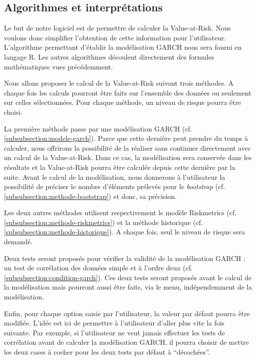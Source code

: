 	\subsection{Algorithmes et interprétations}
		Le but de notre logiciel est de permettre de calculer la Value-at-Risk. Nous voulons donc simplifier l'obtention de cette information pour l'utilisateur. L'algorithme permettant d'établir la modélisation GARCH nous sera fourni en langage R. Les autres algorithmes découlent directement des formules mathématiques vues précédemment.

		Nous allons proposer le calcul de la Value-at-Risk suivant trois méthodes. A chaque fois les calculs pourront être faits sur l'ensemble des données ou seulement sur celles sélectionnées. Pour chaque méthode, un niveau de risque pourra être choisi.

		La première méthode passe par une modélisation GARCH (cf. \ref{subsubsection:modele-garch}). Parce que cette dernière peut prendre du temps à calculer, nous offrirons la possibilité de la réaliser sans continuer directement avec un calcul de la Value-at-Risk. Dans ce cas, la modélisation sera conservée dans les résultats et la Value-at-Risk pourra être calculée depuis cette dernière par la suite. Avant le calcul de la modélisation, nous donnerons à l'utilisateur la possibilité de préciser le nombre d'éléments prélevés pour le \textit{bootstrap} (cf. \ref{subsubsection:methode-bootstrap}) et donc, sa précision.

		Les deux autres méthodes utilisent respectivement le modèle Riskmetrics (cf. \ref{subsubsection:methode-riskmetrics}) et la méthode historique (cf. \ref{subsubsection:methode-historique}). A chaque fois, seul le niveau de risque sera demandé.

		Deux tests seront proposés pour vérifier la validité de la modélisation GARCH : un test de corrélation des données simple et à l'ordre deux (cf. \ref{subsubsection:condition-garch}). Ces deux tests seront proposés avant le calcul de la modélisation mais pourront aussi être faits, via le menu, indépendemment de la modélisation.

		Enfin, pour chaque option saisie par l'utilisateur, la valeur par défaut pourra être modifiée. L'idée est ici de permettre à l'utilisateur d'aller plus vite la fois suivante. Par exemple, si l'utilisateur ne veut jamais effectuer les tests de corrélation avant de calculer la modélisation GARCH, il pourra choisir de mettre les deux cases à cocher pour les deux tests par défaut à “décochées”.


